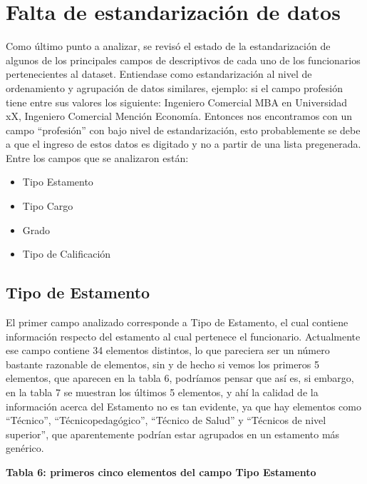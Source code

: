\documentclass[11pt]{article}
\providecommand{\tightlist}{%
      \setlength{\itemsep}{0pt}\setlength{\parskip}{0pt}}
\begin{document}
    
    \hypertarget{falta-de-estandarizaciuxf3n-de-datos}{%
\section{Falta de estandarización de
datos}\label{falta-de-estandarizaciuxf3n-de-datos}}

    Como último punto a analizar, se revisó el estado de la estandarización
de algunos de los principales campos de descriptivos de cada uno de los
funcionarios pertenecientes al dataset. Entiendase como estandarización
al nivel de ordenamiento y agrupación de datos similares, ejemplo: si el
campo profesión tiene entre sus valores los siguiente: Ingeniero
Comercial MBA en Universidad xX, Ingeniero Comercial Mención Economía.
Entonces nos encontramos con un campo ``profesión'' con bajo nivel de
estandarización, esto probablemente se debe a que el ingreso de estos
datos es digitado y no a partir de una lista pregenerada. Entre los
campos que se analizaron están:

\begin{itemize}
\tightlist
\item
  Tipo Estamento
\item
  Tipo Cargo
\item
  Grado
\item
  Tipo de Calificación
\end{itemize}

    \hypertarget{tipo-de-estamento}{%
\subsection{Tipo de Estamento}\label{tipo-de-estamento}}

    El primer campo analizado corresponde a Tipo de Estamento, el cual
contiene información respecto del estamento al cual pertenece el
funcionario. Actualmente ese campo contiene 34 elementos distintos, lo
que pareciera ser un número bastante razonable de elementos, sin y de
hecho si vemos los primeros 5 elementos, que aparecen en la tabla 6,
podríamos pensar que así es, si embargo, en la tabla 7 se muestran los
últimos 5 elementos, y ahí la calidad de la información acerca del
Estamento no es tan evidente, ya que hay elementos como ``Técnico'',
``Técnicopedagógico'', ``Técnico de Salud'' y ``Técnicos de nivel
superior'', que aparentemente podrían estar agrupados en un estamento
más genérico.

    \textbf{Tabla 6: primeros cinco elementos del campo Tipo Estamento}
\end{document}
